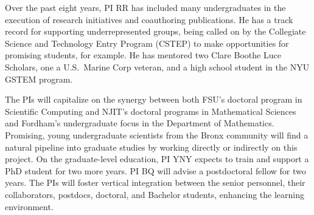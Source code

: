 Over the past eight years, PI RR has included many undergraduates in the
execution of research initiatives and coauthoring publications. He has a
track record for supporting underrepresented groups, being called on by
the Collegiate Science and Technology Entry Program (CSTEP) to make
opportunities for promising students, for example. He has mentored two
Clare Boothe Luce Scholars, one a U.S.~Marine Corp veteran, and a high
school student in the NYU GSTEM program. 

The PIs will capitalize on the synergy between both FSU's doctoral program in Scientific Computing and NJIT's doctoral programs
in Mathematical Sciences and Fordham's undergraduate focus in the
Department of Mathematics. Promising, young undergraduate scientists
from the Bronx community will find a natural pipeline into graduate
studies by working directly or indirectly on this project. On the
graduate-level education, PI YNY expects to train and support a PhD
student for two more years. PI BQ will advise a postdoctoral fellow for
two years. The PIs will foster vertical integration between the senior
personnel, their collaborators, postdocs, doctoral, and Bachelor
students, enhancing the learning environment.

%
%

